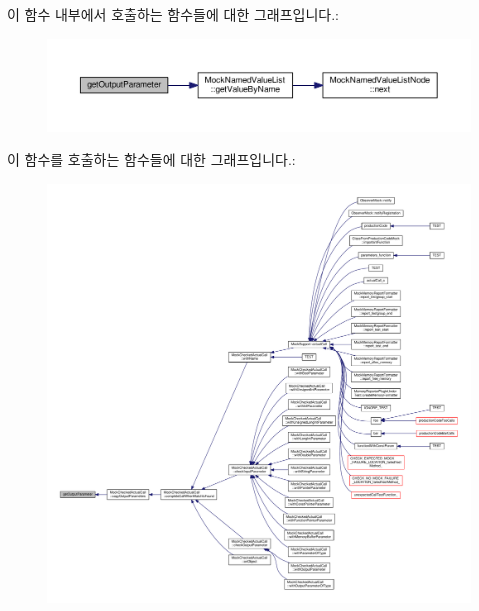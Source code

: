 이 함수 내부에서 호출하는 함수들에 대한 그래프입니다.\+:
\nopagebreak
\begin{figure}[H]
\begin{center}
\leavevmode
\includegraphics[width=350pt]{class_mock_checked_expected_call_aec87bb7af98237bcd4a01993c9150b52_cgraph}
\end{center}
\end{figure}




이 함수를 호출하는 함수들에 대한 그래프입니다.\+:
\nopagebreak
\begin{figure}[H]
\begin{center}
\leavevmode
\includegraphics[width=350pt]{class_mock_checked_expected_call_aec87bb7af98237bcd4a01993c9150b52_icgraph}
\end{center}
\end{figure}


